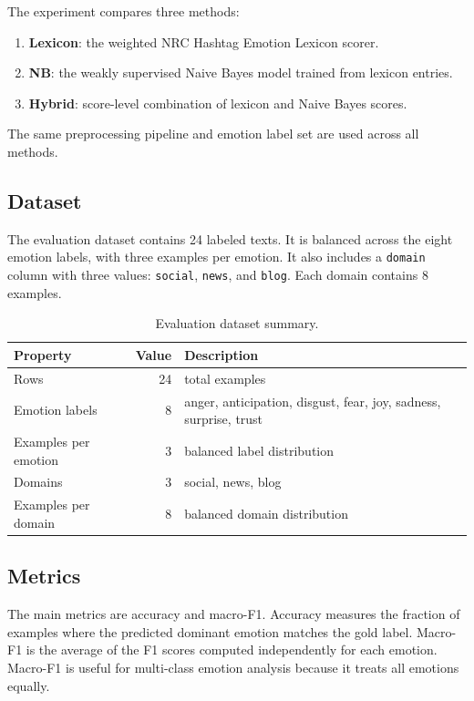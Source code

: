 \documentclass[11pt]{article}
\begin{document}
The experiment compares three methods:

\begin{enumerate}
    \item \textbf{Lexicon}: the weighted NRC Hashtag Emotion Lexicon scorer.
    \item \textbf{NB}: the weakly supervised Naive Bayes model trained from lexicon entries.
    \item \textbf{Hybrid}: score-level combination of lexicon and Naive Bayes scores.
\end{enumerate}

The same preprocessing pipeline and emotion label set are used across all methods.

\subsection{Dataset}

The evaluation dataset contains 24 labeled texts. It is balanced across the eight emotion labels, with three examples per emotion. It also includes a \texttt{domain} column with three values: \texttt{social}, \texttt{news}, and \texttt{blog}. Each domain contains 8 examples.

\begin{table}[h]
\centering
\small
\begin{tabular}{lrl}
\toprule
\textbf{Property} & \textbf{Value} & \textbf{Description} \\
\midrule
Rows & 24 & total examples \\
Emotion labels & 8 & anger, anticipation, disgust, fear, joy, sadness, surprise, trust \\
Examples per emotion & 3 & balanced label distribution \\
Domains & 3 & social, news, blog \\
Examples per domain & 8 & balanced domain distribution \\
\bottomrule
\end{tabular}
\caption{Evaluation dataset summary.}
\label{tab:dataset}
\end{table}

\subsection{Metrics}

The main metrics are accuracy and macro-F1. Accuracy measures the fraction of examples where the predicted dominant emotion matches the gold label. Macro-F1 is the average of the F1 scores computed independently for each emotion. Macro-F1 is useful for multi-class emotion analysis because it treats all emotions equally.
\end{document}

